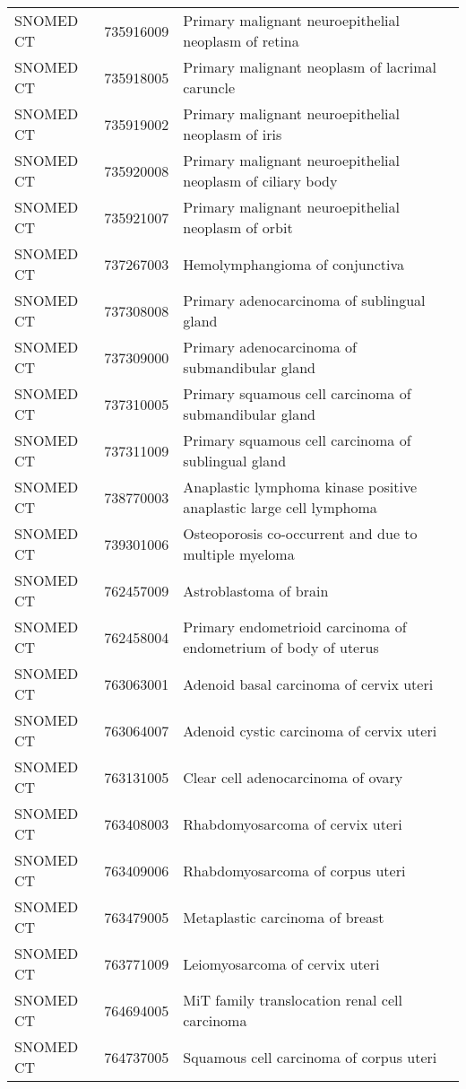 \begin{longtable}{p{}p{}p{}}
  SNOMED CT & 735916009 & Primary malignant neuroepithelial neoplasm of retina \\ 
  SNOMED CT & 735918005 & Primary malignant neoplasm of lacrimal caruncle \\ 
  SNOMED CT & 735919002 & Primary malignant neuroepithelial neoplasm of iris \\ 
  SNOMED CT & 735920008 & Primary malignant neuroepithelial neoplasm of ciliary body \\ 
  SNOMED CT & 735921007 & Primary malignant neuroepithelial neoplasm of orbit \\ 
  SNOMED CT & 737267003 & Hemolymphangioma of conjunctiva \\ 
  SNOMED CT & 737308008 & Primary adenocarcinoma of sublingual gland \\ 
  SNOMED CT & 737309000 & Primary adenocarcinoma of submandibular gland \\ 
  SNOMED CT & 737310005 & Primary squamous cell carcinoma of submandibular gland \\ 
  SNOMED CT & 737311009 & Primary squamous cell carcinoma of sublingual gland \\ 
  SNOMED CT & 738770003 & Anaplastic lymphoma kinase positive anaplastic large cell lymphoma \\ 
  SNOMED CT & 739301006 & Osteoporosis co-occurrent and due to multiple myeloma \\ 
  SNOMED CT & 762457009 & Astroblastoma of brain \\ 
  SNOMED CT & 762458004 & Primary endometrioid carcinoma of endometrium of body of uterus \\ 
  SNOMED CT & 763063001 & Adenoid basal carcinoma of cervix uteri \\ 
  SNOMED CT & 763064007 & Adenoid cystic carcinoma of cervix uteri \\ 
  SNOMED CT & 763131005 & Clear cell adenocarcinoma of ovary \\ 
  SNOMED CT & 763408003 & Rhabdomyosarcoma of cervix uteri \\ 
  SNOMED CT & 763409006 & Rhabdomyosarcoma of corpus uteri \\ 
  SNOMED CT & 763479005 & Metaplastic carcinoma of breast \\ 
  SNOMED CT & 763771009 & Leiomyosarcoma of cervix uteri \\ 
  SNOMED CT & 764694005 & MiT family translocation renal cell carcinoma \\ 
  SNOMED CT & 764737005 & Squamous cell carcinoma of corpus uteri \\ 

\end{longtable}
